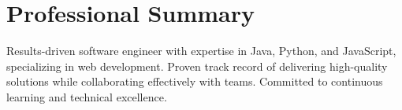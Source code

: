 \section*{Professional Summary}
\noindent\makebox[\linewidth]{\rule{\textwidth}{0.2pt}}

Results-driven software engineer with expertise in Java, Python, and JavaScript, 
specializing in web development. Proven track record of delivering high-quality 
solutions while collaborating effectively with teams. Committed to continuous 
learning and technical excellence.